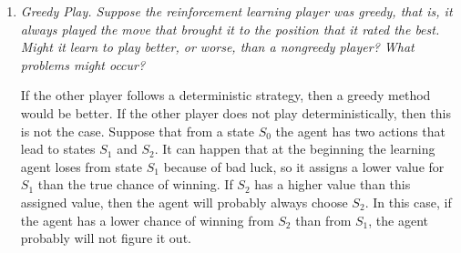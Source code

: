 \documentclass[12pt,a4paper]{article}
\begin{document}
\begin{enumerate}
  \item
    \textit{
      Greedy Play. Suppose the reinforcement learning player was greedy, that is, it always played the move that brought it to the position that it rated the best. Might it  learn to play better, or worse, than a nongreedy player? What problems might occur?}

    If the other player follows a deterministic strategy, then a greedy method would be better. If the other player does not play deterministically, then this is not the case. Suppose that from a state $S_0$ the agent has two actions that lead to states $S_1$ and $S_2$. It can happen that at the beginning the learning agent loses from state $S_1$ because of bad luck, so it assigns a lower value for $S_1$ than the true chance of winning. If $S_2$ has a higher value than this assigned value, then the agent will probably always choose $S_2$. In this case, if the agent has a lower chance of winning from $S_2$ than from $S_1$, the agent probably will not figure it out.




\end{enumerate}
\end{document}
